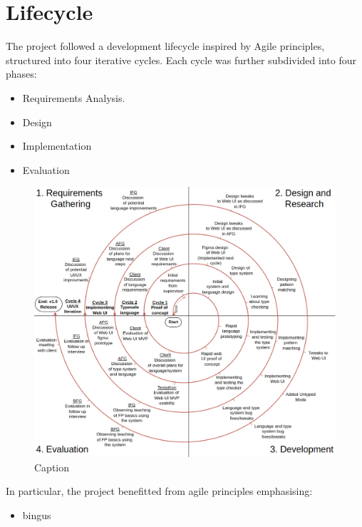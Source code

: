 \chapter{Lifecycle}
The project followed a development lifecycle inspired by Agile principles\cite{agilemanifesto2001}, structured into four iterative cycles. Each cycle was further subdivided into four phases:

\begin{itemize}
    \item Requirements Analysis. 
    \item Design
    \item Implementation 
    \item Evaluation
\end{itemize}

\begin{figure}[htbp]
    \centering
    \includegraphics[width=\linewidth]{images/spiral1.drawio.png}
    \caption{Caption}\label{fig:spiral}
\end{figure}

In particular, the project benefitted from agile principles emphasising:
\begin{itemize}
    \item bingus
\end{itemize}

